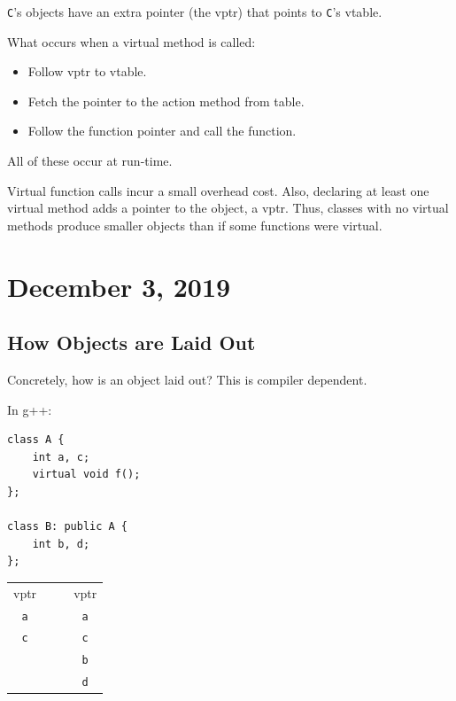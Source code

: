 \documentclass[11pt]{article}
\theoremstyle{definition}
\begin{document}
{\tt C}'s objects have an extra pointer (the vptr) that points to {\tt C}'s vtable.

What occurs when a virtual method is called:\vspace{-1.5ex}
\begin{itemize}
    \item Follow vptr to vtable.
    \item Fetch the pointer to the action method from table.
    \item Follow the function pointer and call the function.
\end{itemize}\vspace{-1.5ex}
All of these occur at run-time.

Virtual function calls incur a small overhead cost. Also, declaring at least one virtual method adds a pointer to the object, a vptr. Thus, classes with no virtual methods produce smaller objects than if some functions were virtual.

\newpage
\section{December 3, 2019}

\subsection{How Objects are Laid Out}
Concretely, how is an object laid out? This is compiler dependent. 

In g++:
\begin{lstlisting}
class A {
    int a, c;
    virtual void f();
};

class B: public A {
    int b, d;
};
\end{lstlisting}\vspace{-1.5ex}

\begin{table}[h]
\centering
\begin{tabular}{|c|cl|c|}
\cline{1-1} \cline{4-4}
vptr    &  &  & vptr    \\ \cline{1-1} \cline{4-4} 
{\tt a} &  &  & {\tt a} \\ \cline{1-1} \cline{4-4} 
{\tt c} &  &  & {\tt c} \\ \cline{1-1} \cline{4-4} 
        &  &  & {\tt b} \\ \cline{1-1} \cline{4-4} 
        &  &  & {\tt d} \\ \cline{1-1} \cline{4-4} 
\end{tabular}
\end{table}
\end{document}
